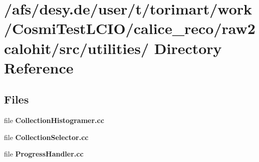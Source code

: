 \section{/afs/desy.de/user/t/torimart/work/CosmiTestLCIO/calice\_\-reco/raw2calohit/src/utilities/ Directory Reference}
\label{dir_910c5a21d20ab9aa503c716fa1fb26fe}
\subsection*{Files}
\begin{DoxyCompactItemize}
\item 
file {\bfseries CollectionHistogramer.cc}
\item 
file {\bfseries CollectionSelector.cc}
\item 
file {\bfseries ProgressHandler.cc}
\end{DoxyCompactItemize}
